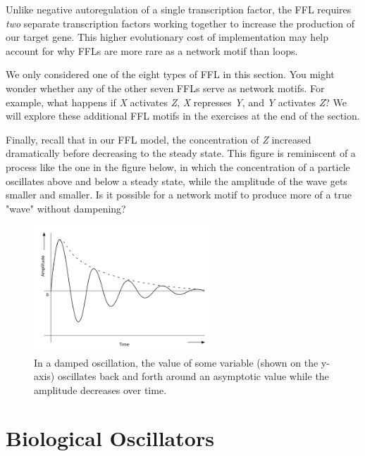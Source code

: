 Unlike negative autoregulation of a single transcription factor, the FFL requires \textit{two} separate transcription factors working together to increase the production of our target gene. This higher evolutionary cost of implementation may help account for why FFLs are more rare as a network motif than loops.

We only considered one of the eight types of FFL in this section. You might wonder whether any of the other seven FFLs serve as network motifs.  For example, what happens if \textit{X} activates \textit{Z}, \textit{X} represses \textit{Y}, and \textit{Y} activates \textit{Z}? We will explore these additional FFL motifs in the exercises at the end of the section.

Finally, recall that in our FFL model, the concentration of \textit{Z} increased dramatically before decreasing to the steady state. This figure is reminiscent of a  process like the one in the figure below, in which the concentration of a particle oscillates above and below a steady state, while the amplitude of the wave gets smaller and smaller. Is it possible for a network motif to produce more of a true "wave" without dampening?

\begin{figure}[h]
\centering
\mySfFamily
\includegraphics[width = 0.6\textwidth]{../assets/images/600px/damped_oscillator.png}
\caption{In a damped oscillation, the value of some variable (shown on the y-axis) oscillates back and forth around an asymptotic value while the amplitude decreases over time.}
\label{fig:damped_oscillator}
\end{figure}


\FloatBarrier
{}

\section{Biological Oscillators}
\label{sec:biological_oscillators}

